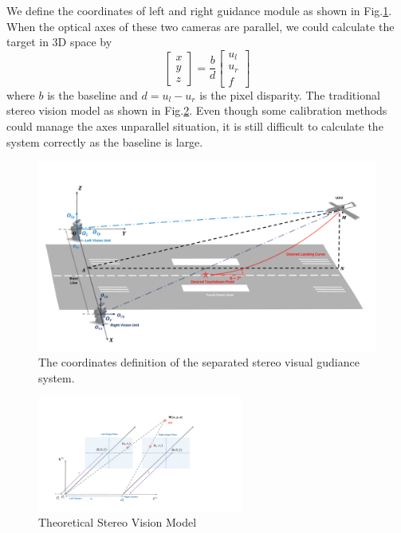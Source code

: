 We define the coordinates of left and right guidance module as shown in Fig.\ref{fig:Fig04_GeneralSystem}. When the optical axes of these two cameras are parallel, we could calculate the target in 3D space by
\begin{equation}
\left[ {\begin{array}{*{20}{c}}
	x \\ 
	y \\ 
	z 
	\end{array}} \right] =\frac{b}{d} \left[ {\begin{array}{*{20}{c}}
	u_l \\ 
	u_r \\ 
	f 
	\end{array}} \right]
\end{equation}
where $b$ is the baseline and $d=u_l-u_r$ is the pixel disparity. The traditional stereo vision model as shown in Fig.\ref{fig:chp03_vision_20_basic_stereo}. Even though some calibration methods could manage the axes unparallel situation, it is still difficult to calculate the system correctly as the baseline is large.
\begin{figure}[!hb]
	\centering
	\includegraphics[width=\textwidth]{Figs/Fig04_GeneralSystem.pdf}
	\caption{The coordinates definition of the separated stereo visual gudiance system.}
	\label{fig:Fig04_GeneralSystem}
\end{figure}

\begin{figure}[!tb]
	\centering
	\includegraphics[width=0.6\textwidth]{figs/chp03_vision_20_basic_stereo.pdf}	
	\caption{Theoretical Stereo Vision Model}
	\label{fig:chp03_vision_20_basic_stereo}
\end{figure}


